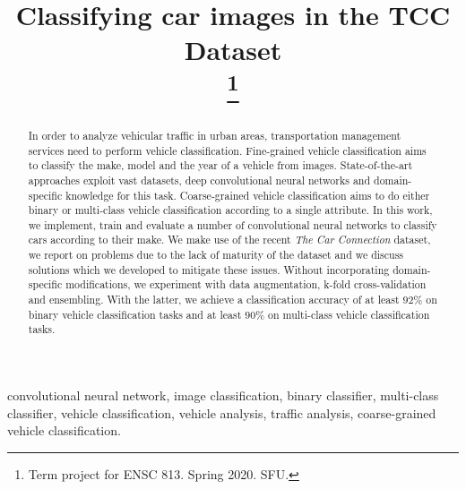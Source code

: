 \documentclass[conference]{IEEEtran}
\begin{document}
\title{Classifying car images in the TCC Dataset\\
\thanks{Term project for ENSC 813. Spring 2020. SFU.}
}

\author{
}

\maketitle

\begin{abstract}
In order to analyze vehicular traffic in urban areas, transportation management services need to perform vehicle classification. Fine-grained vehicle classification aims to classify the make, model and the year of a vehicle from images. State-of-the-art approaches exploit vast datasets, deep convolutional neural networks and domain-specific knowledge for this task. Coarse-grained vehicle classification aims to do either binary or multi-class vehicle classification according to a single attribute. In this work, we implement, train and evaluate a number of convolutional neural networks to classify cars according to their make. We make use of the recent \textit{The Car Connection} dataset, we report on problems due to the lack of maturity of the dataset and we discuss solutions which we developed to mitigate these issues. Without incorporating domain-specific modifications, we experiment with data augmentation, k-fold cross-validation and ensembling. With the latter, we achieve a classification accuracy of at least $92\%$ on binary vehicle classification tasks and at least $90\%$ on multi-class vehicle classification tasks.
\end{abstract}

\begin{IEEEkeywords}
convolutional neural network, image classification, binary classifier, multi-class classifier, vehicle classification, vehicle analysis, traffic analysis, coarse-grained vehicle classification.
\end{IEEEkeywords}
\end{document}
